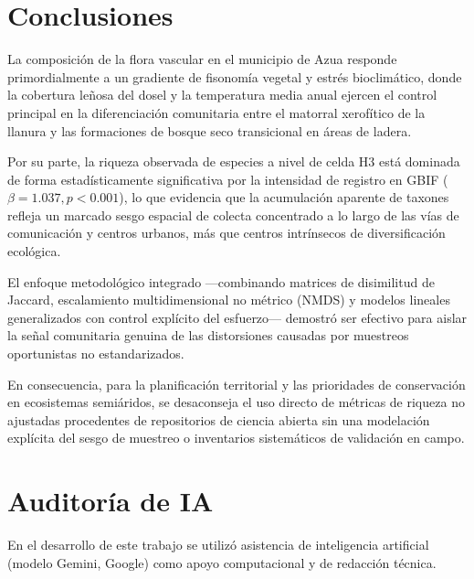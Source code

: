 \documentclass[
  12pt,
  man,
  floatsintext]{apa7}
\begin{document}
\section{Conclusiones}\label{conclusiones}

La composición de la flora vascular en el municipio de Azua responde primordialmente a un gradiente de fisonomía vegetal y estrés bioclimático, donde la cobertura leñosa del dosel y la temperatura media anual ejercen el control principal en la diferenciación comunitaria entre el matorral xerofítico de la llanura y las formaciones de bosque seco transicional en áreas de ladera.

Por su parte, la riqueza observada de especies a nivel de celda H3 está dominada de forma estadísticamente significativa por la intensidad de registro en GBIF (\(\beta = 1.037, p < 0.001\)), lo que evidencia que la acumulación aparente de taxones refleja un marcado sesgo espacial de colecta concentrado a lo largo de las vías de comunicación y centros urbanos, más que centros intrínsecos de diversificación ecológica.

El enfoque metodológico integrado ---combinando matrices de disimilitud de Jaccard, escalamiento multidimensional no métrico (NMDS) y modelos lineales generalizados con control explícito del esfuerzo--- demostró ser efectivo para aislar la señal comunitaria genuina de las distorsiones causadas por muestreos oportunistas no estandarizados.

En consecuencia, para la planificación territorial y las prioridades de conservación en ecosistemas semiáridos, se desaconseja el uso directo de métricas de riqueza no ajustadas procedentes de repositorios de ciencia abierta sin una modelación explícita del sesgo de muestreo o inventarios sistemáticos de validación en campo.

\section{Auditoría de IA}\label{auditoruxeda-de-ia}

En el desarrollo de este trabajo se utilizó asistencia de inteligencia artificial (modelo Gemini, Google) como apoyo computacional y de redacción técnica.
\end{document}
